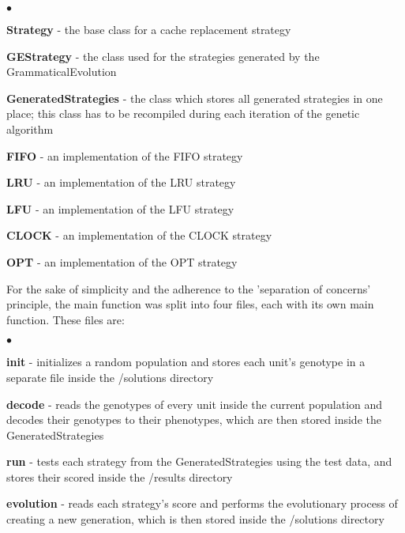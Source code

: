 \begin{list}{$\bullet$}{}  	
	\item \textbf{Strategy} - the base class for a cache replacement strategy
	\item \textbf{GEStrategy} - the class used for the strategies generated by the GrammaticalEvolution
	\item \textbf{GeneratedStrategies} - the class which stores all generated strategies in one place; this class has to be recompiled during each iteration of the genetic algorithm
	\item \textbf{FIFO} - an implementation of the FIFO strategy
	\item \textbf{LRU} - an implementation of the LRU strategy
	\item \textbf{LFU} - an implementation of the LFU strategy
	\item \textbf{CLOCK} - an implementation of the CLOCK strategy
	\item \textbf{OPT} - an implementation of the OPT strategy
\end{list}

For the sake of simplicity and the adherence to the 'separation of concerns' principle, the main function was split into four files, each with its own main function. These files are:

\begin{list}{$\bullet$}{}  	
	\item \textbf{init} - initializes a random population and stores each unit's genotype in a separate file inside the /solutions directory
	\item \textbf{decode} - reads the genotypes of every unit inside the current population and decodes their genotypes to their phenotypes, which are then stored inside the GeneratedStrategies
	\item \textbf{run} - tests each strategy from the GeneratedStrategies using the test data, and stores their scored inside the /results directory
	\item \textbf{evolution} - reads each strategy's score and performs the evolutionary process of creating a new generation, which is then stored inside the /solutions directory
\end{list}

